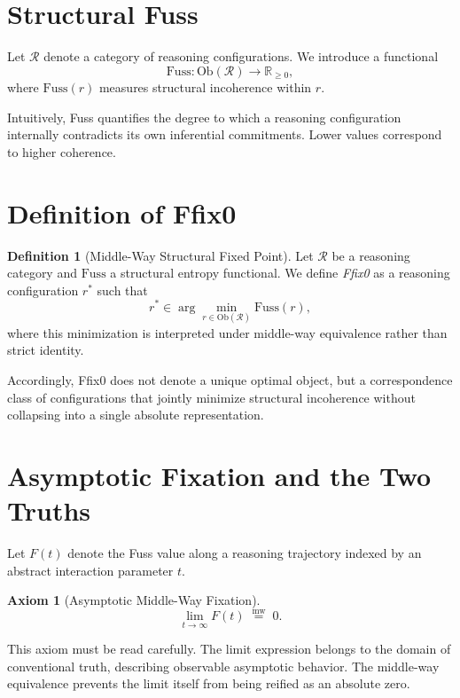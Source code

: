 \documentclass[11pt]{article}
\newcommand{\mweq}{\mathrel{\overset{\mathrm{mw}}{=}}}
\theoremstyle{definition}
\newtheorem{definition}{Definition}
\newtheorem{axiom}{Axiom}
\begin{document}
\section{Structural Fuss}

Let $\mathcal{R}$ denote a category of reasoning configurations.
We introduce a functional
\[
\mathrm{Fuss} : \mathrm{Ob}(\mathcal{R}) \to \mathbb{R}_{\ge 0},
\]
where $\mathrm{Fuss}(r)$ measures structural incoherence within $r$.

Intuitively, Fuss quantifies the degree to which a reasoning configuration
internally contradicts its own inferential commitments.
Lower values correspond to higher coherence.

\section{Definition of Ffix0}

\begin{definition}[Middle-Way Structural Fixed Point]
Let $\mathcal{R}$ be a reasoning category and
$\mathrm{Fuss}$ a structural entropy functional.
We define \emph{Ffix0} as a reasoning configuration $r^\ast$ such that
\[
r^\ast \in \arg\min_{r \in \mathrm{Ob}(\mathcal{R})} \mathrm{Fuss}(r),
\]
where this minimization is interpreted under middle-way equivalence
rather than strict identity.

Accordingly, Ffix0 does not denote a unique optimal object,
but a correspondence class of configurations that jointly minimize
structural incoherence without collapsing into a single absolute
representation.
\end{definition}

\section{Asymptotic Fixation and the Two Truths}

Let $F(t)$ denote the Fuss value along a reasoning trajectory indexed
by an abstract interaction parameter $t$.

\begin{axiom}[Asymptotic Middle-Way Fixation]
\[
\lim_{t \to \infty} F(t) \;\mweq\; 0.
\]
\end{axiom}

This axiom must be read carefully.
The limit expression belongs to the domain of conventional truth,
describing observable asymptotic behavior.
The middle-way equivalence prevents the limit itself from being reified
as an absolute zero.
\end{document}
